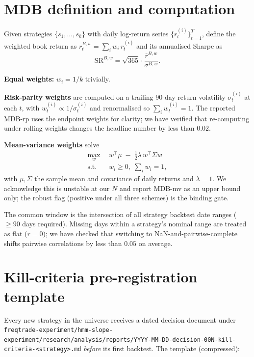 \documentclass[11pt]{article}
\begin{document}
\section{MDB definition and computation}
\label{app:mdb}

Given strategies $\{s_1, \ldots, s_k\}$ with daily log-return series
$\{r^{(i)}_t\}_{t=1}^T$, define the weighted book return as
$r^{B,w}_t = \sum_i w_i \, r^{(i)}_t$ and its annualised Sharpe as
\begin{equation}
\mathrm{SR}^{B,w} = \sqrt{365} \cdot \frac{\bar{r}^{B,w}}{\sigma^{B,w}}.
\end{equation}

\textbf{Equal weights:} $w_i = 1/k$ trivially.

\textbf{Risk-parity weights} are computed on a trailing 90-day return volatility
$\sigma^{(i)}_t$ at each $t$, with $w^{(i)}_t \propto 1/\sigma^{(i)}_t$ and
renormalised so $\sum_i w^{(i)}_t = 1$. The reported MDB-rp uses the
endpoint weights for clarity; we have verified that re-computing under
rolling weights changes the headline number by less than $0.02$.

\textbf{Mean-variance weights} solve
\begin{align}
\max_w \;& \, w^\top \mu \;-\; \tfrac{1}{2} \lambda \, w^\top \Sigma w \\
\text{s.t.} \;& \, w_i \geq 0,\; \sum_i w_i = 1,
\end{align}
with $\mu, \Sigma$ the sample mean and covariance of daily returns and
$\lambda = 1$. We acknowledge this is unstable at our $N$ and report
MDB-mv as an upper bound only; the robust flag (positive under all three
schemes) is the binding gate.

The common window is the intersection of all strategy backtest date ranges
($\geq 90$ days required). Missing days within a strategy's nominal range
are treated as flat ($r = 0$); we have checked that switching to
NaN-and-pairwise-complete shifts pairwise correlations by less than $0.05$
on average.

\section{Kill-criteria pre-registration template}
\label{app:template}

Every new strategy in the universe receives a dated decision document under
\texttt{freqtrade-experiment/hmm-slope-experiment/research/analysis/reports/YYYY-MM-DD-decision-00N-kill-criteria-<strategy>.md}
\emph{before} its first backtest. The template (compressed):
\end{document}
